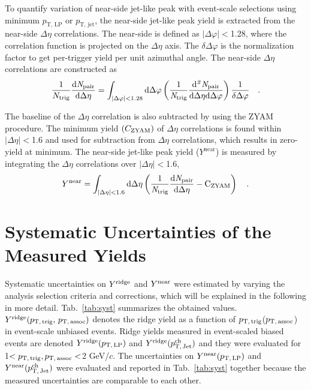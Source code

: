 To quantify variation of near-side jet-like peak with event-scale selections using minimum $p_\mathrm{T,\,LP}$ or $p_\mathrm{T,\,jet}$, the near-side jet-like peak yield is extracted from the near-side $\Delta\eta$ correlations. The near-side is defined as $|\Delta\varphi|<$1.28, where the correlation function is projected on the $\Delta\eta$ axis. The $\delta\Delta\varphi$ is the normalization factor to get per-trigger yield per unit azimuthal angle. The near-side $\Delta\eta$ correlations are constructed as
\begin{eqnarray}
\frac{1}{N_{\rm{trig}}} \frac{ \rm{d}\it{}N_{\rm{pair}} }{ \rm{d}\Delta\eta } = \int_{|\Delta \varphi|<1.28} \rm{d} \Delta \varphi \left( \frac{1}{\it{N}_{\rm{trig}}} \frac{ \rm{d}\it{}^{2} N_{\rm{pair}} }{ \rm{d}\Delta\eta d\Delta\varphi} \right) \dfrac{1}{\delta\Delta\varphi} \quad. 
\end{eqnarray}

The baseline of the $\Delta\eta$ correlation is also subtracted by using the ZYAM procedure. The minimum yield $(C_{\rm{ZYAM}})$ of $\Delta\eta$ correlations is found within $|\Delta\eta|<$1.6 and used for subtraction from  $\Delta\eta$ correlations, which results in zero-yield at minimum. The near-side jet-like peak yield ($Y^{\mathrm{near}}$) is measured by integrating the $\Delta\eta$ correlations over $|\Delta\eta|<$1.6,
\begin{eqnarray}
Y^{\rm{near}} = \int_{|\Delta \eta|<1.6} \rm{d} \Delta\eta \left( \frac{1}{\it{N}_{\rm{trig}}} \frac{ \rm{d}\it{}N_{\rm{pair}} }{ \rm{d}\Delta\eta } - C_{\rm{ZYAM}} \right)\quad.
\end{eqnarray}



\section{Systematic Uncertainties of the Measured Yields}
\label{sec:uncertainties}

Systematic uncertainties on $Y^{\rm{ridge}}$ and $Y^{\rm{near}}$ were estimated by varying the analysis selection criteria and corrections, which will be explained in the following in more detail. Tab.~\ref{tab:syst} summarizes the obtained values. $Y^{\rm{ridge}}(p_\mathrm{T,\,trig},\,p_\mathrm{T,\,assoc})$ denotes the ridge yield as a function of $p_\mathrm{T,\,trig}$($p_\mathrm{T,\,assoc}$) in event-scale unbiased events. Ridge yields measured in event-scaled biased events are denoted $Y^{\rm{ridge}}(p_\mathrm{T,\,LP})$ and $Y^{\rm{ridge}}(p_\mathrm{T,\,Jet}^\mathrm{ch})$ and they were evaluated for 1$<p_\mathrm{T,\,trig}, p_\mathrm{T,\,assoc}<$2 GeV/$c$. The uncertainties on $Y^{\rm{near}}(p_\mathrm{T,\,LP})$ and $Y^{\rm{near}}(p_\mathrm{T,\,Jet}^\mathrm{ch})$ were evaluated and reported in Tab.~\ref{tab:syst} together because the measured uncertainties are comparable to each other.

